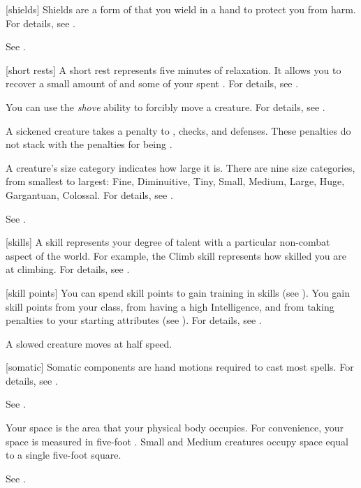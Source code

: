 [shields] Shields are a form of  that you wield in a hand to protect you from harm.
For details, see .

 See .

[short rests] A short rest represents five minutes of relaxation.
It allows you to recover a small amount of  and some of your spent .
For details, see .

 You can use the \textit{shove} ability to forcibly move a creature.
For details, see .

 A sickened creature takes a  penalty to , checks, and defenses.
These penalties do not stack with the penalties for being \nauseated.

 A creature's size category indicates how large it is.
There are nine size categories, from smallest to largest: Fine, Diminuitive, Tiny, Small, Medium, Large, Huge, Gargantuan, Colossal.
For details, see .

 See .

[skills] A skill represents your degree of talent with a particular non-combat aspect of the world.
For example, the Climb skill represents how skilled you are at climbing.
For details, see .

[skill points] You can spend skill points to gain training in skills (see ).
You gain skill points from your class, from having a high Intelligence, and from taking penalties to your starting attributes (see ).
For details, see .

 A slowed creature moves at half speed.

[somatic] Somatic components are hand motions required to cast most spells.
For details, see .

 See .

 Your space is the area that your physical body occupies.
For convenience, your space is measured in five-foot .
Small and Medium creatures occupy space equal to a single five-foot square.

 See .

